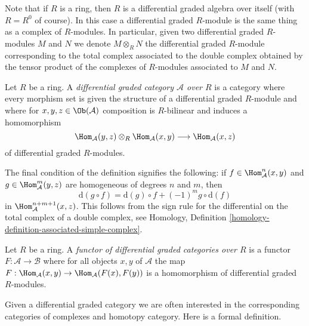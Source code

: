 \noindent
Note that if $R$ is a ring, then $R$ is a differential graded algebra
over itself (with $R = R^0$ of course). In this case a differential
graded $R$-module is the same thing as a complex of $R$-modules.
In particular, given two differential graded $R$-modules $M$ and $N$
we denote $M \otimes_R N$ the differential graded $R$-module
corresponding to the total complex associated to the double
complex obtained by the tensor product of the complexes of $R$-modules
associated to $M$ and $N$.

\begin{definition}
\label{definition-dga-category}
Let $R$ be a ring. A {\it differential graded category $\mathcal{A}$
over $R$} is a category where every morphism set is given the structure
of a differential graded $R$-module and where for
$x, y, z \in \Ob(\mathcal{A})$ composition is $R$-bilinear and induces
a homomorphism
$$
\Hom_\mathcal{A}(y, z) \otimes_R \Hom_\mathcal{A}(x, y)
\longrightarrow
\Hom_\mathcal{A}(x, z)
$$
of differential graded $R$-modules.
\end{definition}

\noindent
The final condition of the definition signifies the following:
if $f \in \Hom_\mathcal{A}^n(x, y)$ and
$g \in \Hom_\mathcal{A}^m(y, z)$ are homogeneous
of degrees $n$ and $m$, then
$$
\text{d}(g \circ f) = \text{d}(g) \circ f + (-1)^mg \circ \text{d}(f)
$$
in $\Hom_\mathcal{A}^{n + m + 1}(x, z)$. This follows from the sign
rule for the differential on the total complex of a double complex, see
Homology, Definition \ref{homology-definition-associated-simple-complex}.

\begin{definition}
\label{definition-functor-dga-categories}
Let $R$ be a ring. A {\it functor of differential graded categories over $R$}
is a functor $F : \mathcal{A} \to \mathcal{B}$ where for all objects
$x, y$ of $\mathcal{A}$ the map
$F : \Hom_\mathcal{A}(x, y) \to \Hom_\mathcal{A}(F(x), F(y))$
is a homomorphism of differential graded $R$-modules.
\end{definition}

\noindent
Given a differential graded category we are often interested in the
corresponding categories of complexes and homotopy category.
Here is a formal definition.

